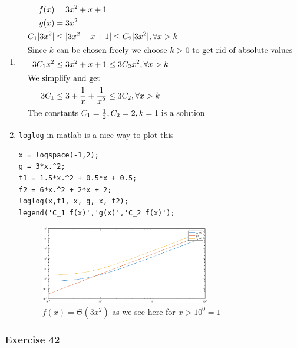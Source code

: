 \documentclass[a4paper]{article}
\newcommand{\ex}[1]{\subsubsection*{#1}}
\begin{document}
\begin{enumerate}[label=\alph*)]
    \item 
        \begin{align}
            f(x) &= 3x^2 + x + 1 \\
            g(x) &= 3x^2 \\
            C_1|3x^2| &\leq |3x^2 + x + 1| \leq C_2|3x^2|, \forall x > k \\
            \intertext{Since \(k\) can be chosen freely we choose \(k > 0\) to get rid
                of absolute values}
            3C_1x^2 &\leq 3x^2 + x + 1 \leq 3C_2x^2, \forall x > k \\
            \intertext{We simplify and get}
            3C_1 &\leq 3 + \frac{1}{x} + \frac{1}{x^2} \leq 3C_2, \forall x > k \\
            \intertext{The constants \(C_1 = \frac{1}{2}, C_2 = 2, k = 1\) is a solution}
        \end{align}

    \item {
        \texttt{loglog} in matlab is a nice way to plot this
        \begin{verbatim}
x = logspace(-1,2);
g = 3*x.^2;
f1 = 1.5*x.^2 + 0.5*x + 0.5;
f2 = 6*x.^2 + 2*x + 2;
loglog(x,f1, x, g, x, f2);
legend('C_1 f(x)','g(x)','C_2 f(x)');
        \end{verbatim}
        \begin{figure}[H]
            \centering
            \includegraphics[width=0.7\textwidth]{ex34b.eps}
            \caption{\(f(x) = \Theta(3x^2)\) as we see here for \(x > 10^0 = 1\)}
        \end{figure}
    }
\end{enumerate}


\ex{Exercise 42}
\end{document}
